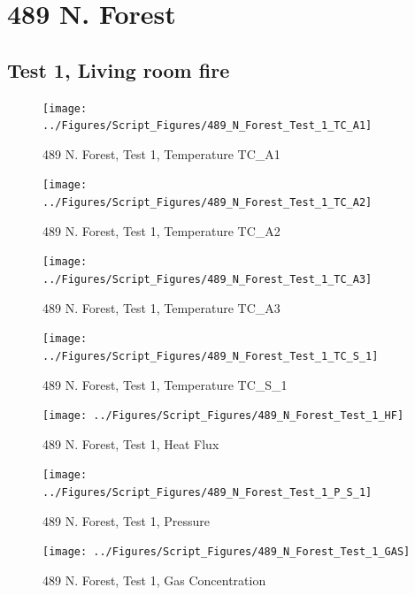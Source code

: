 \documentclass[12pt,oneside]{book}
\begin{document}
\clearpage


\section{489 N. Forest}

\subsection{Test 1, Living room fire}

\begin{figure}[!ht]
\texttt{[image: ../Figures/Script\_Figures/489\_N\_Forest\_Test\_1\_TC\_A1]}
\caption{489 N. Forest, Test 1, Temperature TC\_A1}
\label{fig:489_N_Forest_Test_1_TC_A1}
\end{figure}

\begin{figure}[!ht]
\texttt{[image: ../Figures/Script\_Figures/489\_N\_Forest\_Test\_1\_TC\_A2]}
\caption{489 N. Forest, Test 1, Temperature TC\_A2}
\label{fig:489_N_Forest_Test_1_TC_A2}
\end{figure}

\begin{figure}[!ht]
\texttt{[image: ../Figures/Script\_Figures/489\_N\_Forest\_Test\_1\_TC\_A3]}
\caption{489 N. Forest, Test 1, Temperature TC\_A3}
\label{fig:489_N_Forest_Test_1_TC_A3}
\end{figure}

\begin{figure}[!ht]
\texttt{[image: ../Figures/Script\_Figures/489\_N\_Forest\_Test\_1\_TC\_S\_1]}
\caption{489 N. Forest, Test 1, Temperature TC\_S\_1}
\label{fig:489_N_Forest_Test_1_TC_S_1}
\end{figure}

\begin{figure}[!ht]
\texttt{[image: ../Figures/Script\_Figures/489\_N\_Forest\_Test\_1\_HF]}
\caption{489 N. Forest, Test 1, Heat Flux}
\label{fig:489_N_Forest_Test_1_HF}
\end{figure}

\begin{figure}[!ht]
\texttt{[image: ../Figures/Script\_Figures/489\_N\_Forest\_Test\_1\_P\_S\_1]}
\caption{489 N. Forest, Test 1, Pressure}
\label{fig:489_N_Forest_Test_1_P_S_1}
\end{figure}

\begin{figure}[!ht]
\texttt{[image: ../Figures/Script\_Figures/489\_N\_Forest\_Test\_1\_GAS]}
\caption{489 N. Forest, Test 1, Gas Concentration}
\label{fig:489_N_Forest_Test_1_GAS}
\end{figure}
\end{document}
